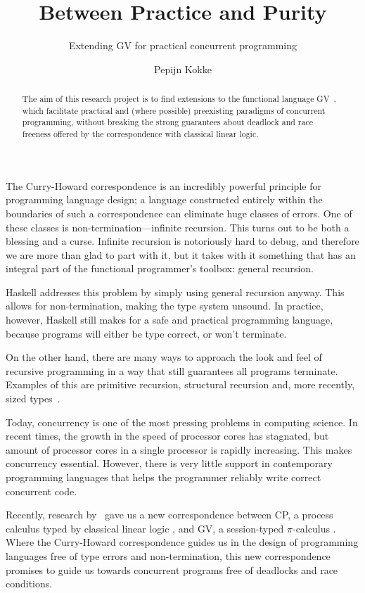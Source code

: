 \documentclass{scrartcl}
\title{Between Practice and Purity}
\subtitle{Extending GV for practical concurrent programming}
\author{Pepijn Kokke}
\begin{document}
\maketitle

\begin{abstract}
  The aim of this research project is to find extensions to the
  functional language GV~\citep{wadler2012}, which facilitate practical
  and (where possible) preexisting paradigms of concurrent
  programming, without breaking the strong guarantees about deadlock
  and race freeness offered by the correspondence with classical
  linear logic.
\end{abstract}

\vspace{5ex}

The Curry-Howard correspondence is an incredibly powerful principle
for programming language design; a language constructed entirely
within the boundaries of such a correspondence can eliminate huge
classes of errors.
One of these classes is non-termination---infinite recursion. This
turns out to be both a blessing and a curse. Infinite recursion is
notoriously hard to debug, and therefore we are more than glad to part
with it, but it takes with it something that has an integral part of
the functional programmer's toolbox: general recursion.

Haskell addresses this problem by simply using general recursion
anyway. This allows for non-termination, making the type system
unsound. In practice, however, Haskell still makes for a safe and
practical programming language, because programs will either be type
correct, or won't terminate.

On the other hand, there are many ways to approach the look and feel
of recursive programming in a way that still guarantees all programs
terminate. Examples of this are primitive recursion, structural
recursion and, more recently, sized types~\citep{lee2001}.

\vspace{5mm}

Today, concurrency is one of the most pressing problems in computing
science. In recent times, the growth in the speed of processor cores
has stagnated, but amount of processor cores in a single processor is
rapidly increasing. This makes concurrency essential. However, there
is very little support in contemporary programming languages that
helps the programmer reliably write correct concurrent code.

Recently, research by~\citet{wadler2012,caires2010,gay2009} gave us a
new correspondence between CP, a process calculus typed by classical
linear logic \citep{girard1987}, and GV, a session-typed $\pi$-calculus
\citep{honda1993,milner1992a,milner1992b}.
Where the Curry-Howard correspondence guides us in the design of
programming languages free of type errors and non-termination, this
new correspondence promises to guide us towards concurrent programs
free of deadlocks and race conditions.
\end{document}
